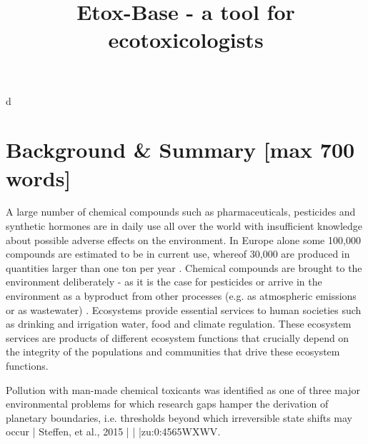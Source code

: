 d\documentclass[english]{article}
\begin{document}
\title{Etox-Base - a tool for ecotoxicologists}


\begin{abstract}

\end{abstract}


\section*{Background \& Summary [max 700 words]}

A large number of chemical compounds such as pharmaceuticals, pesticides and synthetic hormones are in daily use all over the world with insufficient knowledge about possible adverse effects on the environment. In Europe alone some 100,000 compounds are estimated to be in current use, whereof 30,000 are produced in quantities larger than one ton per year \citep{breithaupt_costs_2006}. Chemical compounds are brought to the environment deliberately - as it is the case for pesticides or arrive in the environment as a byproduct from other processes (e.g. as atmospheric emissions or as wastewater) \citep{schwarzenbach_challenge_2006}. Ecosystems provide essential services to human societies such as drinking and irrigation water, food and climate regulation. These ecosystem services are products of different ecosystem functions that crucially depend on the integrity of the populations and communities that drive these ecosystem functions.


Pollution with man-made chemical toxicants was identified as one of three major environmental problems for which research gaps hamper the derivation of planetary boundaries, i.e. thresholds beyond which irreversible state shifts may occur { | Steffen, et al., 2015 | | |zu:0:4565WXWV}.
\end{document}
